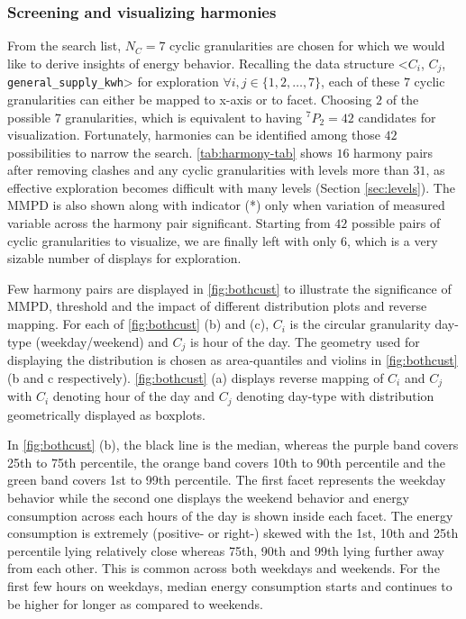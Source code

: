 \documentclass[
]{article}
\begin{document}
\hypertarget{screening-and-visualizing-harmonies}{%
\subsubsection{Screening and visualizing harmonies}\label{screening-and-visualizing-harmonies}}

From the search list, \(N_C = 7\) cyclic granularities are chosen for which we would like to derive insights of energy behavior. Recalling the data structure \textless{}\(C_i\), \(C_j\), \texttt{general\_supply\_kwh}\textgreater{} for exploration \(\forall i, j \in \{1, 2, \ldots, 7\}\), each of these \(7\) cyclic granularities can either be mapped to x-axis or to facet. Choosing \(2\) of the possible \(7\) granularities, which is equivalent to having \(^{7}P_2 = 42\) candidates for visualization. Fortunately, harmonies can be identified among those \(42\) possibilities to narrow the search. \autoref{tab:harmony-tab} shows \(16\) harmony pairs after removing clashes and any cyclic granularities with levels more than \(31\), as effective exploration becomes difficult with many levels (Section \ref{sec:levels}). The MMPD is also shown along with indicator (*) only when variation of measured variable across the harmony pair significant. Starting from \(42\) possible pairs of cyclic granularities to visualize, we are finally left with only \(6\), which is a very sizable number of displays for exploration.

Few harmony pairs are displayed in \autoref{fig:bothcust} to illustrate the significance of MMPD, threshold and the impact of different distribution plots and reverse mapping.
\noindent For each of \autoref{fig:bothcust} (b) and (c), \(C_i\) is the circular granularity day-type (weekday/weekend) and \(C_j\) is hour of the day. The geometry used for displaying the distribution is chosen as area-quantiles and violins in \autoref{fig:bothcust} (b and c respectively). \autoref{fig:bothcust} (a) displays reverse mapping of \(C_i\) and \(C_j\) with \(C_i\) denoting hour of the day and \(C_j\) denoting day-type with distribution geometrically displayed as boxplots.

In \autoref{fig:bothcust} (b), the black line is the median, whereas the purple band covers 25th to 75th percentile, the orange band covers 10th to 90th percentile and the green band covers 1st to 99th percentile. The first facet represents the weekday behavior while the second one displays the weekend behavior and energy consumption across each hours of the day is shown inside each facet. The energy consumption is extremely (positive- or right-) skewed with the 1st, 10th and 25th percentile lying relatively close whereas 75th, 90th and 99th lying further away from each other. This is common across both weekdays and weekends. For the first few hours on weekdays, median energy consumption starts and continues to be higher for longer as compared to weekends.
\end{document}
